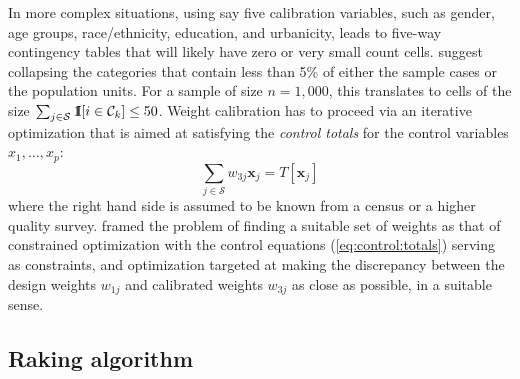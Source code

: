 In more complex situations, using say five calibration variables,
such as gender, age groups, race/ethnicity, education, and urbanicity,
leads to five-way contingency tables that will likely have zero or
very small count cells. \citet{batt:izra:hoag:fran:2009} suggest
collapsing the categories that contain less than 5\% of either
the sample cases or the population units. For a sample of size
$n=1,000$, this translates to cells of the size
$\sum_{j \in \mathcal{S}} {\rm 1\kern-.3em I}[i \in \mathcal{C}_k] \le 50$.
Weight calibration has to proceed
via an iterative optimization that is aimed at satisfying
the {\it control totals} for the control variables $x_1, \ldots, x_p$:
\begin{equation}
    \sum_{j \in \mathcal{S}} w_{3j} \mathbf{x}_j
    = T [ \mathbf{x}_j  ]
    \label{eq:control:totals}
\end{equation}
where the right hand side is assumed to be known from a census or
a higher quality survey.
\citet{deville:sarndal:1992} framed the problem of finding a suitable
set of weights as that of constrained optimization with the control
equations (\ref{eq:control:totals}) serving as constraints,
and optimization targeted at making the discrepancy between
the design weights $w_{1j}$ and calibrated weights
$w_{3j}$ as close as possible, in a suitable sense.

\subsection{Raking algorithm}
\label{subsec:raking:algorithm}

